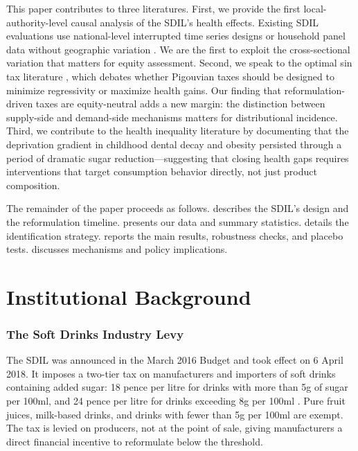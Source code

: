 \documentclass[12pt]{article}
\begin{document}
This paper contributes to three literatures. First, we provide the first local-authority-level causal analysis of the SDIL's health effects. Existing SDIL evaluations use national-level interrupted time series designs \citep{scarborough2020, pell2021} or household panel data without geographic variation \citep{bandy2020}. We are the first to exploit the cross-sectional variation that matters for equity assessment. Second, we speak to the optimal sin tax literature \citep{allcott2019, dubois2020}, which debates whether Pigouvian taxes should be designed to minimize regressivity or maximize health gains. Our finding that reformulation-driven taxes are equity-neutral adds a new margin: the distinction between supply-side and demand-side mechanisms matters for distributional incidence. Third, we contribute to the health inequality literature \citep{marmot2020, bambra2020} by documenting that the deprivation gradient in childhood dental decay and obesity persisted through a period of dramatic sugar reduction---suggesting that closing health gaps requires interventions that target consumption behavior directly, not just product composition.

The remainder of the paper proceeds as follows.  describes the SDIL's design and the reformulation timeline.  presents our data and summary statistics.  details the identification strategy.  reports the main results, robustness checks, and placebo tests.  discusses mechanisms and policy implications.

\section{Institutional Background}
\label{sec:background}

\subsubsection*{The Soft Drinks Industry Levy} The SDIL was announced in the March 2016 Budget and took effect on 6 April 2018. It imposes a two-tier tax on manufacturers and importers of soft drinks containing added sugar: 18 pence per litre for drinks with more than 5g of sugar per 100ml, and 24 pence per litre for drinks exceeding 8g per 100ml \citep{hmrc2023}. Pure fruit juices, milk-based drinks, and drinks with fewer than 5g per 100ml are exempt. The tax is levied on producers, not at the point of sale, giving manufacturers a direct financial incentive to reformulate below the threshold.
\end{document}
